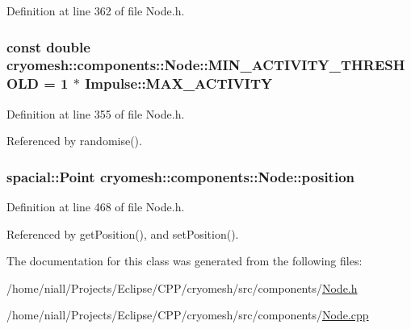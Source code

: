 \-Definition at line 362 of file \-Node.\-h.

\hypertarget{classcryomesh_1_1components_1_1Node_a5ed72f665cf7b32914e61b4655bd52ca}{
\subsubsection[{\-M\-I\-N\-\_\-\-A\-C\-T\-I\-V\-I\-T\-Y\-\_\-\-T\-H\-R\-E\-S\-H\-O\-L\-D}]{\setlength{\rightskip}{0pt plus 5cm}const double {\bf cryomesh\-::components\-::\-Node\-::\-M\-I\-N\-\_\-\-A\-C\-T\-I\-V\-I\-T\-Y\-\_\-\-T\-H\-R\-E\-S\-H\-O\-L\-D} = 1 $\ast$ {\bf \-Impulse\-::\-M\-A\-X\-\_\-\-A\-C\-T\-I\-V\-I\-T\-Y}}}\label{classcryomesh_1_1components_1_1Node_a5ed72f665cf7b32914e61b4655bd52ca}


\-Definition at line 355 of file \-Node.\-h.



\-Referenced by randomise().

\hypertarget{classcryomesh_1_1components_1_1Node_afad345a6d8cc1eacc555acde8c065b61}{
\subsubsection[{position}]{\setlength{\rightskip}{0pt plus 5cm}spacial\-::\-Point {\bf cryomesh\-::components\-::\-Node\-::position}}}\label{classcryomesh_1_1components_1_1Node_afad345a6d8cc1eacc555acde8c065b61}


\-Definition at line 468 of file \-Node.\-h.



\-Referenced by get\-Position(), and set\-Position().



\-The documentation for this class was generated from the following files\-:\begin{DoxyCompactItemize}
\item 
/home/niall/\-Projects/\-Eclipse/\-C\-P\-P/cryomesh/src/components/\hyperlink{Node_8h}{\-Node.\-h}\item 
/home/niall/\-Projects/\-Eclipse/\-C\-P\-P/cryomesh/src/components/\hyperlink{Node_8cpp}{\-Node.\-cpp}\end{DoxyCompactItemize}
